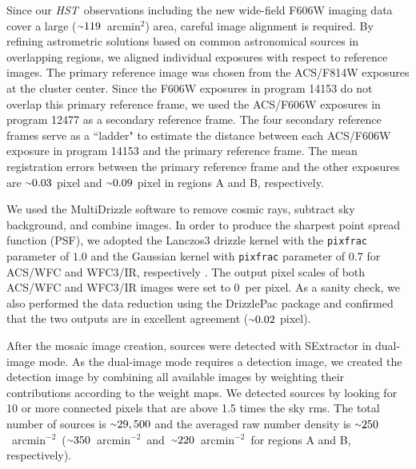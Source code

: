 \documentclass[twocolumn]{aastex631}
\newcommand{\HST}{{\it HST}}
\newcommand{\mytilde}{\raise.19ex\hbox{$\scriptstyle\sim$}}
\newcommand{\persqarcmin}{arcmin$^{-2}$}
\newcommand{\sqarcmin}{arcmin$^{2}$}
\begin{document}
Since our \HST~observations including the new wide-field F606W imaging data cover a large ($\mytilde119$~\sqarcmin) area, careful image alignment is required. 
By refining astrometric solutions based on common astronomical sources in overlapping regions, we aligned individual exposures with respect to reference images. 
The primary reference image was chosen from the ACS/F814W exposures at the cluster center. 
Since the F606W exposures in program 14153 do not overlap this primary reference frame, we used the ACS/F606W exposures in program 12477 as a secondary reference frame. 
The four secondary reference frames serve as a ``ladder" to estimate the distance between each ACS/F606W exposure in program 14153 and the primary reference frame. 
The mean registration errors between the primary reference frame and the other exposures are $\mytilde0.03$ pixel and $\mytilde0.09$ pixel in regions A and B, respectively.


We used the MultiDrizzle \citep{2002multidrizzle} software to remove cosmic rays, subtract sky background, and combine images. 
In order to produce the sharpest point spread function (PSF), we adopted the Lanczos3 drizzle kernel with the {\tt pixfrac} parameter of $1.0$ and the Gaussian kernel with {\tt pixfrac} parameter of $0.7$ for ACS/WFC and WFC3/IR, respectively \citep[][]{Jee2007a,Jee2017}. 
The output pixel scales of both ACS/WFC and WFC3/IR images were set to 0~per pixel. 
As a sanity check, we also performed the data reduction using the DrizzlePac \citep{DrizzlePac} package and confirmed that the two outputs are in excellent agreement ($\mytilde0.02$ pixel).


After the mosaic image creation, sources were detected with SExtractor \citep{Bertin1996} in dual-image mode. 
As the dual-image mode requires a detection image, we created the detection image by combining all available images by weighting their contributions according to the weight maps. 
We detected sources by looking for 10 or more connected pixels that are above 1.5 times the sky rms. 
The total number of sources is $\mytilde29,500$ and the averaged raw number density is $\mytilde250$~\persqarcmin~($\mytilde350$~\persqarcmin~and~$\mytilde220$~\persqarcmin~for regions A and B, respectively).
\end{document}
